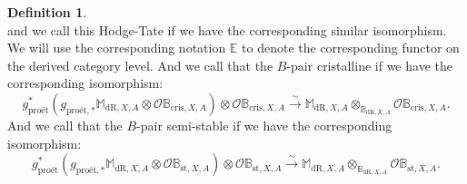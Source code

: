 \documentclass[12pt]{amsart}
\theoremstyle{definition}
\newtheorem{definition}[theorem]{Definition}
\numberwithin{equation}{section}
\begin{document}
\begin{definition}
\begin{displaymath}
\end{displaymath}
and we call this Hodge-Tate if we have the corresponding similar isomorphism. We will use the corresponding notation $\mathbb{E}$ to denote the corresponding functor on the derived category level. And we call that the $B$-pair cristalline if we have the corresponding isomorphism:
\begin{displaymath}
g^*_\text{pro\'et}(g_{\text{pro\'et},*} \mathbb{M}_{\mathrm{dR},X,A}\otimes	 \mathcal{O}\mathbb{B}_{\mathrm{cris},X,A})\otimes\mathcal{O}\mathbb{B}_{\mathrm{cris},X,A} \overset{\sim}{\rightarrow} \mathbb{M}_{\mathrm{dR},X,A}\otimes_{\mathbb{B}_{\mathrm{dR},X,A}}	 \mathcal{O}\mathbb{B}_{\mathrm{cris},X,A}.
\end{displaymath}
And we call that the $B$-pair semi-stable if we have the corresponding isomorphism:
\begin{displaymath}
g^*_\text{pro\'et}(g_{\text{pro\'et},*} \mathbb{M}_{\mathrm{dR},X,A}\otimes	 \mathcal{O}\mathbb{B}_{\mathrm{st},X,A})\otimes\mathcal{O}\mathbb{B}_{\mathrm{st},X,A} \overset{\sim}{\rightarrow} \mathbb{M}_{\mathrm{dR},X,A}\otimes_{\mathbb{B}_{\mathrm{dR},X,A}}	 \mathcal{O}\mathbb{B}_{\mathrm{st},X,A}.
\end{displaymath}	
\end{definition}
\end{document}
